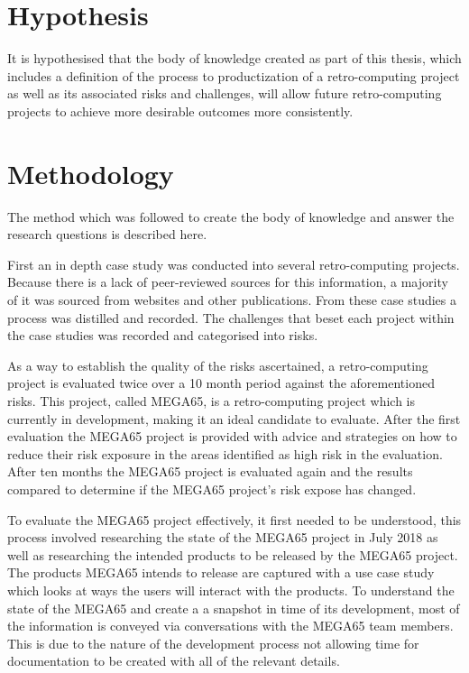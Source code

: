 \section{Hypothesis}
It is hypothesised that the body of knowledge created as part of this thesis, which includes a definition of the process to productization of a retro-computing project as well as its associated risks and challenges, will allow future retro-computing projects to achieve more desirable outcomes more consistently.


\section{Methodology}
The method which was followed to create the body of knowledge and answer the research questions is described here. 

First an in depth case study was conducted into several retro-computing projects. Because there is a lack of peer-reviewed sources for this information, a majority of it was sourced from websites and other publications. From these case studies a process was distilled and recorded. The challenges that beset each project within the case studies was recorded and categorised into risks. 

As a way to establish the quality of the risks ascertained, a retro-computing project is evaluated twice over a 10 month period against the aforementioned risks. This project, called MEGA65, is a retro-computing project which is currently in development, making it an ideal candidate to evaluate. After the first evaluation the MEGA65 project is provided with advice and strategies on how to reduce their risk exposure in the areas identified as high risk in the evaluation. After ten months the MEGA65 project is evaluated again and the results compared to determine if the MEGA65 project's risk expose has changed. 

To evaluate the MEGA65 project effectively, it first needed to be understood, this process involved researching the state of the MEGA65 project in July 2018 as well as researching the intended products to be released by the MEGA65 project. The products MEGA65 intends to release are captured with a use case study which looks at ways the users will interact with the products. To understand the state of the MEGA65 and create a a snapshot in time of its development, most of the information is conveyed via conversations with the MEGA65 team members. This is due to the nature of the development process not allowing time for documentation to be created with all of the relevant details. 

